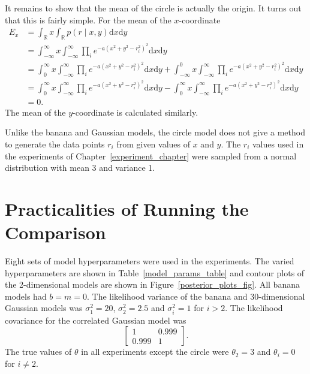 \documentclass[english,twoside,openright]{HYgraduMLDS}
\newcommand{\R}{\mathbb{R}}
\newcommand{\dx}{\mathrm{d}}
\begin{document}
It remains to show that the mean of the circle is actually the origin. It turns
out that this is fairly simple. For the mean of the \(x\)-coordinate
\begin{align*}
  E_{x} &= \int_{\R} x\int_{\R} p(r\mid x, y)\dx x\dx y
  \\&= \int_{-\infty}^{\infty} x\int_{-\infty}^{\infty}
  \prod_{i} e^{-a(x^{2} + y^{2} - r_{i}^{2})^{2}}\dx x\dx y
  \\&= \int_{0}^{\infty} x\int_{-\infty}^{\infty}
  \prod_{i} e^{-a(x^{2} + y^{2} - r_{i}^{2})^{2}}\dx x\dx y
  + \int_{-\infty}^{0}x\int_{-\infty}^{\infty}
  \prod_{i} e^{-a(x^{2} + y^{2} - r_{i}^{2})^{2}}\dx x\dx y
  \\&= \int_{0}^{\infty} x\int_{-\infty}^{\infty}
  \prod_{i} e^{-a(x^{2} + y^{2} - r_{i}^{2})^{2}}\dx x\dx y
  - \int_{0}^{\infty} x\int_{-\infty}^{\infty}
  \prod_{i} e^{-a(x^{2} + y^{2} - r_{i}^{2})^{2}}\dx x\dx y
  \\&= 0.
\end{align*}
The mean of the \(y\)-coordinate is calculated similarly.

Unlike the banana and Gaussian models,
the circle model does not give a method to generate the data points
\(r_{i}\) from given values of \(x\) and \(y\). The \(r_{i}\) values used
in the experiments of Chapter~\ref{experiment_chapter} were sampled
from a normal distribution with mean 3 and variance 1.

\section{Practicalities of Running the Comparison}\label{practical_section}

Eight sets of model hyperparameters were used in the experiments.
The varied hyperparameters are shown in
Table~\ref{model_params_table} and contour plots of the
2-dimensional models are shown in Figure~\ref{posterior_plots_fig}.
All banana models had \(b = m = 0\). The likelihood variance of the banana
and 30-dimensional Gaussian
models was \(\sigma_{1}^{2} = 20\), \(\sigma_{2}^{2} = 2.5\) and
\(\sigma_{i}^{2} = 1\)
for \(i > 2\). The likelihood covariance for the correlated Gaussian model
was
\[
\begin{bmatrix}
  1 & 0.999 \\
  0.999 & 1
\end{bmatrix}.
\]
The true values of \(\theta\) in all experiments except the circle were
\(\theta_{2} = 3\) and \(\theta_{i} = 0\) for \(i \neq 2\).
\end{document}

